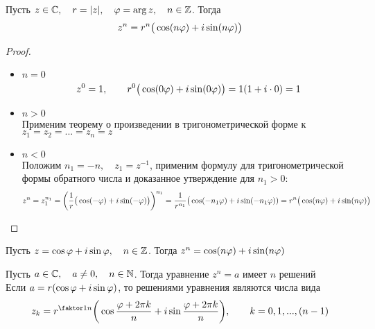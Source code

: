 \begin{theorem}
	Пусть $z \in \mathbb{C}, \quad r = |z|, \quad \varphi = \arg z, \quad n \in \mathbb{Z}$. Тогда
	$$ z^n = r^n \big( \cos(n\varphi) + i \sin (n\varphi) \big) $$
\end{theorem}

\begin{proof}
	\hfill
	\begin{itemize}
		\item $n = 0$
		$$ z^0 = 1, \qquad r^0 \big( \cos(0\varphi) + i \sin(0\varphi) \big) = 1(1 + i \cdot 0) = 1 $$
		\item $n > 0$ \\
		Применим теорему о произведении в тригонометрической форме к $z_1 = z_2 = ... = z_n = z $
		\item $n < 0$ \\
		Положим $n_1 = -n, \quad z_1 = z^{-1}$, применим формулу для тригонометрической формы обратного числа и доказанное утверждение для $n_1 > 0$:
		$$ z^n = z_1^{n_1} = \bigg( \frac1r \big( \cos(-\varphi) + i \sin(-\varphi) \big) \bigg)^{n_1} = \frac1{r^{n_1}} \big( \cos(-n_1\varphi) + i \sin(-n_1\varphi)) = r^n \big( \cos(n\varphi) + i\sin(n\varphi) \big) $$
	\end{itemize}
\end{proof}

\begin{implication}
	Пусть $z = \cos \varphi + i \sin \varphi, \quad n \in \mathbb{Z}$. Тогда $z^n = \cos(n\varphi) + i\sin(n\varphi) $
\end{implication}

\begin{theorem}
	Пусть $a \in \mathbb{C}, \quad a \ne 0, \quad n \in \mathbb{N}$. Тогда уравнение $z^n = a$ имеет $n$ решений \\
	Если $ a = r(\cos \varphi + i \sin \varphi)$, то решениями уравнения являются числа вида
	$$ z_k = r^{\faktor1n}\bigg( \cos \frac{\vphi + 2\pi k}n + i \sin \frac{\vphi + 2\pi k}n \bigg), \qquad k = 0, 1, ..., (n - 1) $$
\end{theorem}

